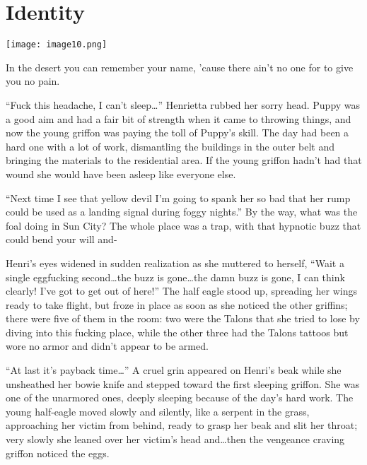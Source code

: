 \chapter{Identity}

\texttt{[image: image10.png]}

\begin{intro}
In the desert you can remember your name, 'cause there ain't no one for to give you no pain.    
\end{intro}


``Fuck this headache, I can't sleep\dots'' Henrietta rubbed her sorry head. Puppy was a good aim and had a fair bit of strength when it came to throwing things, and now the young griffon was paying the toll of Puppy's skill. The day had been a hard one with a lot of work, dismantling the buildings in the outer belt and bringing the materials to the residential area. If the young griffon hadn't had that wound she would have been asleep like everyone else.

``Next time I see that yellow devil I'm going to spank her so bad that her rump could be used as a landing signal during foggy nights.'' By the way, what was the foal doing in Sun City? The whole place was a trap, with that hypnotic buzz that could bend your will and-

Henri's eyes widened in sudden realization as she muttered to herself, ``Wait a single eggfucking second\dots the buzz is gone\dots the damn buzz is gone, I can think clearly! I've got to get out of here!'' The half eagle stood up, spreading her wings ready to take flight, but froze in place as soon as she noticed the other griffins; there were five of them in the room: two were the Talons that she tried to lose by diving into this fucking place, while the other three had the Talons tattoos but wore no armor and didn't appear to be armed.

``At last it's payback time\dots'' A cruel grin appeared on Henri's beak while she unsheathed her bowie knife and stepped toward the first sleeping griffon. She was one of the unarmored ones, deeply sleeping because of the day's hard work. The young half-eagle moved slowly and silently, like a serpent in the grass, approaching her victim from behind, ready to grasp her beak and slit her throat; very slowly she leaned over her victim's head and\dots then the vengeance craving griffon noticed the eggs.

